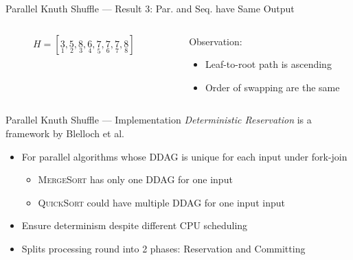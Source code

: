 \begin{frame}{Parallel Knuth Shuffle --- Result 3: Par. and Seq. have Same Output}
  \begin{columns}
    \begin{column}{0.45\textwidth}
      \begin{figure}
        \centering
        \caption{\(H = [
          \underset{1}{3}, 
          \underset{2}{5}, 
          \underset{3}{8}, 
          \underset{4}{6}, 
          \underset{5}{7}, 
          \underset{6}{7}, 
          \underset{7}{7}, 
          \underset{8}{8} 
        ]\)}
      \end{figure}
    \end{column}
    \begin{column}{0.5\textwidth}
      Observation: 
      \begin{itemize}
        \item Leaf-to-root path is ascending
        \item Order of swapping are the same
      \end{itemize}
    \end{column}
  \end{columns}
\end{frame}

\begin{frame}{Parallel Knuth Shuffle --- Implementation}
  \textit{Deterministic Reservation} is a framework by Blelloch et al. 
  \cite{blelloch-detreserve}
  \begin{itemize}
    \item For parallel algorithms whose DDAG is
      unique for each input under fork-join
      \begin{itemize}
        \item \textsc{MergeSort} has only one DDAG for one input
        \item \textsc{QuickSort} could have multiple DDAG for one input
          input
      \end{itemize}
    \item Ensure determinism despite different CPU scheduling
    \item Splits processing round into 2 phases: Reservation and Committing
  \end{itemize}
\end{frame}

